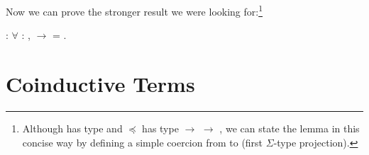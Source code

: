 Now we can prove the stronger result we were looking for:\footnote{Although
  \coqdocvariable{\ensuremath{\alpha}} has type
   and $\preceq$
  has type  $\rightarrow$
   $\rightarrow$ ,
  we can state the lemma in this concise way by defining a simple coercion
  from  to
   (first $\Sigma$-type
  projection).}
\begin{singlespace}
\begin{coqdoccode}
\coqdocnoindent
{}
:
\ensuremath{\forall} \coqdocvar{\ensuremath{\alpha}} :
,
\coqdocvariable{\ensuremath{\alpha}} \coqdocinductive{\ensuremath{\preceq}}
\ensuremath{\rightarrow}
\coqdocvariable{\ensuremath{\alpha}} =
.\coqdoceol
\end{coqdoccode}
\end{singlespace}


\section{Coinductive Terms}

